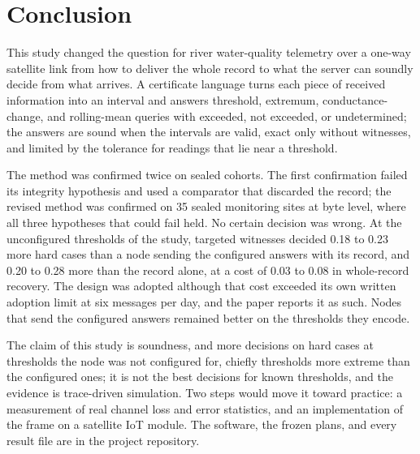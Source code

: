 \section{Conclusion}
\label{sec:conclusion}

This study changed the question for river water-quality telemetry over a one-way satellite link from how to deliver the whole record to what the server can soundly decide from what arrives. A certificate language turns each piece of received information into an interval and answers threshold, extremum, conductance-change, and rolling-mean queries with exceeded, not exceeded, or undetermined; the answers are sound when the intervals are valid, exact only without witnesses, and limited by the tolerance for readings that lie near a threshold.

The method was confirmed twice on sealed cohorts. The first confirmation failed its integrity hypothesis and used a comparator that discarded the record; the revised method was confirmed on 35 sealed monitoring sites at byte level, where all three hypotheses that could fail held. No certain decision was wrong. At the unconfigured thresholds of the study, targeted witnesses decided 0.18 to 0.23 more hard cases than a node sending the configured answers with its record, and 0.20 to 0.28 more than the record alone, at a cost of 0.03 to 0.08 in whole-record recovery. The design was adopted although that cost exceeded its own written adoption limit at six messages per day, and the paper reports it as such. Nodes that send the configured answers remained better on the thresholds they encode.

The claim of this study is soundness, and more decisions on hard cases at thresholds the node was not configured for, chiefly thresholds more extreme than the configured ones; it is not the best decisions for known thresholds, and the evidence is trace-driven simulation. Two steps would move it toward practice: a measurement of real channel loss and error statistics, and an implementation of the frame on a satellite IoT module. The software, the frozen plans, and every result file are in the project repository.
